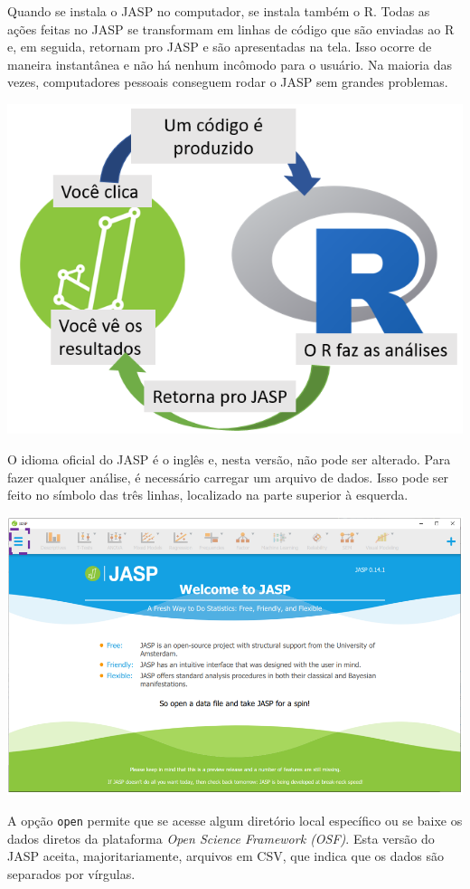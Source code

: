 \documentclass[
]{book}
\begin{document}
Quando se instala o JASP no computador, se instala também o R. Todas as
ações feitas no JASP se transformam em linhas de código que são enviadas
ao R e, em seguida, retornam pro JASP e são apresentadas na tela. Isso
ocorre de maneira instantânea e não há nenhum incômodo para o usuário.
Na maioria das vezes, computadores pessoais conseguem rodar o JASP sem
grandes problemas.

\includegraphics{./img/capa_r_jasp.png}

O idioma oficial do JASP é o inglês e, nesta versão, não pode ser
alterado. Para fazer qualquer análise, é necessário carregar um arquivo
de dados. Isso pode ser feito no símbolo das três linhas, localizado na
parte superior à esquerda.

\includegraphics{./img/cap_jasp_abrir.png}

A opção \texttt{open} permite que se acesse algum diretório local
específico ou se baixe os dados diretos da plataforma \emph{Open Science
Framework (OSF)}. Esta versão do JASP aceita, majoritariamente, arquivos
em CSV, que indica que os dados são separados por vírgulas.
\end{document}

